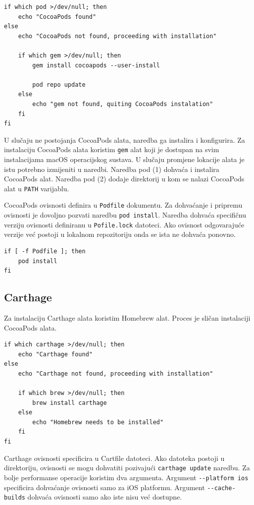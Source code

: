 \documentclass[times, utf8, diplomski, numeric]{fer}
\begin{document}
\begin{appendices}
\begin{verbatim}
if which pod >/dev/null; then
    echo "CocoaPods found"
else
    echo "CocoaPods not found, proceeding with installation"

    if which gem >/dev/null; then
        gem install cocoapods --user-install

        pod repo update
    else
        echo "gem not found, quiting CocoaPods instalation"
    fi
fi
\end{verbatim}

U slučaju ne postojanja CocoaPods alata, naredba ga instalira i konfigurira. Za instalaciju CocoaPods alata koristim \verb|gem| alat koji je dostupan na svim instalacijama macOS operacijskog sustava. U slučaju promjene lokacije alata je istu potrebno izmijeniti u naredbi. Naredba pod (1) dohvaća i instalira CocoaPods alat. Naredba pod (2) dodaje direktorij u kom se nalazi CocoaPods alat u \verb|PATH| varijablu.

CocoaPods ovisnosti definira u \verb|Podfile| dokumentu. Za dohvaćanje i pripremu ovisnosti je dovoljno pozvati naredbu \verb|pod install|. Naredba dohvaća specifičnu verziju ovisnosti definiranu u \verb|Pofile.lock| datoteci. Ako ovisnost odgovarajuće verzije već postoji u lokalnom repozitoriju onda se ista ne dohvaća ponovno.

\begin{verbatim}
if [ -f Podfile ]; then
    pod install
fi
\end{verbatim}


\subsection{Carthage}

Za instalaciju Carthage alata koristim Homebrew alat. Proces je sličan instalaciji CocoaPods alata.

\begin{verbatim}
if which carthage >/dev/null; then
    echo "Carthage found"
else
    echo "Carthage not found, proceeding with installation"

    if which brew >/dev/null; then
        brew install carthage
    else
        echo "Homebrew needs to be installed"
    fi
fi
\end{verbatim}

Carthage ovisnosti specificira u Cartfile datoteci. Ako datoteka postoji u direktoriju, ovisnosti se mogu dohvatiti pozivajući \verb|carthage update| naredbu. Za bolje performanse operacije koristim dva argumenta. Argument \verb|--platform ios| specificira dohvaćanje ovisnosti samo za iOS platformu. Argument \verb|--cache-builds| dohvaća ovisnosti samo ako iste nisu već dostupne.


\end{appendices}
\end{document}
